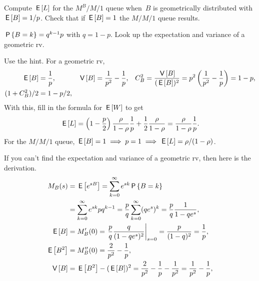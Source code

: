 \documentclass[stochastic-or.tex]{subfiles}
\begin{document}
\begin{exercise}\label{ex:l-168}
Compute $\E\L$ for the $M^{B}/M/1$ queue when~$B$ is geometrically distributed with $\E B = 1/p$.
Check that if $\E B =1$ the $M/M/1$ queue results.
\begin{hint}
$\P{B=k}=q^{k-1}p$ with $q=1-p$. Look up the expectation and variance of a geometric rv.
\end{hint}
\begin{solution}
Use the hint. For a geometric rv,
 \begin{align*}
 \E B &= \frac 1 p, &  \V B &= \frac1{p^2}-\frac1p, &  C_B^2&= \frac{\V B}{(\E B)^2} = p^2 \left(\frac1{p^2}-\frac1p\right)=1-p, \\
 (1+C_B^2)/2 &= 1-p/2,
\end{align*}
With this, fill in the formula for $\E W$ to get
\begin{equation*}
\E \L =
\left(1-\frac p2\right) \frac\rho{1-\rho} \frac 1 p + \frac12\frac\rho{1-\rho}
=\frac\rho{1-\rho} \frac 1 p.
\end{equation*}
For the $M/M/1$ queue, $\E B = 1 \implies p = 1 \implies \E\L=\rho/(1-\rho)$.

If you can't find the expectation and variance of a geometric rv, then here is the derivation.
 \begin{align*}
 M_B(s)
&= \E{e^{sB}} = \sum_{k=0}^\infty e^{sk} \P{B=k} \\
&= \sum_{k=0}^\infty e^{sk} p q^{k-1}
= \frac p q \sum_{k=0}^\infty (q e^s)^k = \frac p q \frac1{1-qe^s},\\
 \E B &= M_B'(0) = \left.\frac p q \frac q{(1-q e^s)^2}\right|_{s=0}= \frac p{(1-q)^2} = \frac 1 p,\\
 \E{B^2} &= M_B''(0) = \frac2{p^2} - \frac1p, \\
 \V B &= \E{B^2} - (\E B)^2 = \frac2{p^2} - \frac1p - \frac1{p^2} = \frac1{p^2}-\frac1p,\\
\end{align*}
\end{solution}
\end{exercise}
\end{document}
